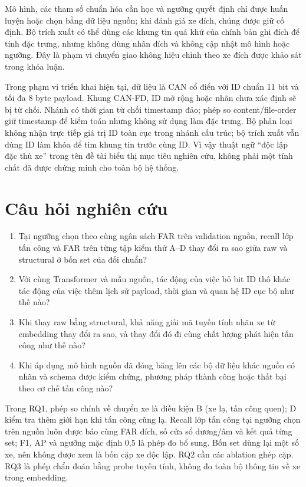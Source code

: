 \documentclass[12pt,a4paper,oneside,openany]{extbook}
\begin{document}
Mô hình, các tham số chuẩn hóa cần học và ngưỡng quyết định chỉ được huấn luyện hoặc chọn bằng dữ liệu nguồn; khi đánh giá xe đích, chúng được giữ cố định. Bộ trích xuất có thể dùng các khung tin quá khứ của chính bản ghi đích để tính đặc trưng, nhưng không dùng nhãn đích và không cập nhật mô hình hoặc ngưỡng. Đây là phạm vi chuyển giao không hiệu chỉnh theo xe đích được khảo sát trong khóa luận.

Trong phạm vi triển khai hiện tại, dữ liệu là CAN cổ điển với ID chuẩn 11 bit và tối đa 8 byte payload. Khung CAN-FD, ID mở rộng hoặc nhãn chưa xác định sẽ bị từ chối. Nhánh có thời gian từ chối timestamp đảo; phép so content/file-order giữ timestamp để kiểm toán nhưng không sử dụng làm đặc trưng. Bộ phân loại không nhận trực tiếp giá trị ID toàn cục trong nhánh cấu trúc; bộ trích xuất vẫn dùng ID làm khóa để tìm khung tin trước cùng ID. Vì vậy thuật ngữ ``độc lập đặc thù xe'' trong tên đề tài biểu thị mục tiêu nghiên cứu, không phải một tính chất đã được chứng minh cho toàn bộ hệ thống.

\section{Câu hỏi nghiên cứu}
\begin{enumerate}[label=\textbf{RQ\arabic*.}]
\item Tại ngưỡng chọn theo cùng ngân sách FAR trên validation nguồn, recall lớp tấn công và FAR trên từng tập kiểm thử A--D thay đổi ra sao giữa raw và structural ở bốn set của đối chuẩn?
\item Với cùng Transformer và mẫu nguồn, tác động của việc bỏ bit ID thô khác tác động của việc thêm lịch sử payload, thời gian và quan hệ ID cục bộ như thế nào?
\item Khi thay raw bằng structural, khả năng giải mã tuyến tính nhãn xe từ embedding thay đổi ra sao, và thay đổi đó đi cùng chất lượng phát hiện tấn công như thế nào?
\item Khi áp dụng mô hình nguồn đã đóng băng lên các bộ dữ liệu khác nguồn có nhãn và schema được kiểm chứng, phương pháp thành công hoặc thất bại theo cơ chế tấn công nào?
\end{enumerate}
Trong RQ1, phép so chính về chuyển xe là điều kiện B (xe lạ, tấn công quen); D kiểm tra thêm giới hạn khi tấn công cũng lạ. Recall lớp tấn công tại ngưỡng chọn trên nguồn luôn được báo cùng FAR đích, số cửa sổ dương/âm và kết quả từng set; F1, AP và ngưỡng mặc định 0,5 là phép đo bổ sung. Bốn set dùng lại một số xe, nên không được xem là bốn cặp xe độc lập. RQ2 cần các ablation ghép cặp. RQ3 là phép chẩn đoán bằng probe tuyến tính, không đo toàn bộ thông tin về xe trong embedding.
\end{document}
